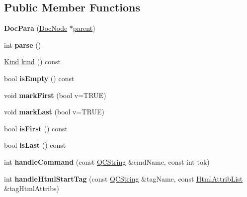 \subsection*{Public Member Functions}
\begin{DoxyCompactItemize}
\item 
\mbox{\label{class_doc_para_a38a380c29bbd63a5a4170ad20a8bade3}} 
{\bfseries Doc\+Para} (\mbox{\hyperlink{class_doc_node}{Doc\+Node}} $\ast$\mbox{\hyperlink{class_doc_node_a73e8ad29a91cfceb0968eb00db71a23d}{parent}})
\item 
\mbox{\label{class_doc_para_afbe48d84c35630599a17f907df4f9804}} 
int {\bfseries parse} ()
\item 
\mbox{\hyperlink{class_doc_node_aebd16e89ca590d84cbd40543ea5faadb}{Kind}} \mbox{\hyperlink{class_doc_para_acd2786d8d5acf861524a60efd2bf4eba}{kind}} () const
\item 
\mbox{\label{class_doc_para_a004ec58b69c71d43ebf4424b04dc5779}} 
bool {\bfseries is\+Empty} () const
\item 
\mbox{\label{class_doc_para_a849868e81af1e2ae0da511fa3e5a91b8}} 
void {\bfseries mark\+First} (bool v=T\+R\+UE)
\item 
\mbox{\label{class_doc_para_a569bc5841973bac45491c977814f62e0}} 
void {\bfseries mark\+Last} (bool v=T\+R\+UE)
\item 
\mbox{\label{class_doc_para_a819aff0142426458d430f63e216bfb74}} 
bool {\bfseries is\+First} () const
\item 
\mbox{\label{class_doc_para_a32a474477c8d44117a82964eeac50e53}} 
bool {\bfseries is\+Last} () const
\item 
\mbox{\label{class_doc_para_a641da9082f47d722a68cc00571758a27}} 
int {\bfseries handle\+Command} (const \mbox{\hyperlink{class_q_c_string}{Q\+C\+String}} \&cmd\+Name, const int tok)
\item 
\mbox{\label{class_doc_para_a64806f3cd0fecd593b8ad7f6ef331688}} 
int {\bfseries handle\+Html\+Start\+Tag} (const \mbox{\hyperlink{class_q_c_string}{Q\+C\+String}} \&tag\+Name, const \mbox{\hyperlink{class_html_attrib_list}{Html\+Attrib\+List}} \&tag\+Html\+Attribs)

\end{DoxyCompactItemize}
